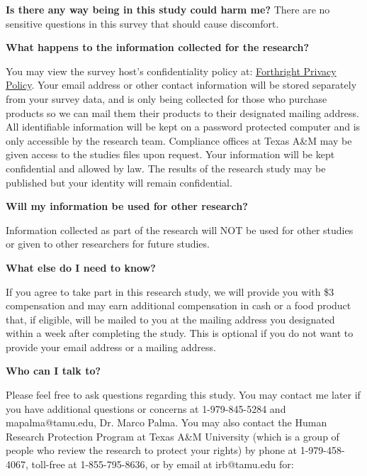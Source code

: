 \documentclass[12pt]{article}
\begin{document}
{\textbf{Is there any way being in this study could harm me?}
There are no sensitive questions in this survey that should cause discomfort. \par

\textbf{What happens to the information collected for the research?} \par
You may view the survey host’s confidentiality policy at: \href{https://www.beforthright.com/privacy}{Forthright Privacy Policy}. Your email address or other contact information will be stored separately from your survey data, and is only being collected for those who purchase products so we can mail them their products to their designated mailing address. All identifiable information will be kept on a password protected computer and is only accessible by the research team. Compliance offices at Texas A\&M may be given access to the studies files upon request. Your information will be kept confidential and allowed by law. The results of the research study may be published but your identity will remain confidential. \par

\textbf{Will my information be used for other research?} \par
Information collected as part of the research will NOT be used for other studies or given to other researchers for future studies. \par

\textbf{What else do I need to know?} \par

If you agree to take part in this research study, we will provide you with  \$3 compensation and may earn additional compensation in cash or a food product that, if eligible, will be mailed to you at the mailing address you designated within a week after completing the study. This is optional if you do not want to provide your email address or a mailing address. \par

\textbf{Who can I talk to?} \par

Please feel free to ask questions regarding this study. You may contact me later if you have additional questions or concerns at 1-979-845-5284 and mapalma@tamu.edu, Dr. Marco Palma. You may also contact the Human Research Protection Program at Texas A\&M University (which is a group of people who review the research to protect your rights) by phone at 1-979-458-4067, toll-free at 1-855-795-8636, or by email at irb@tamu.edu for:\par

}
\end{document}
